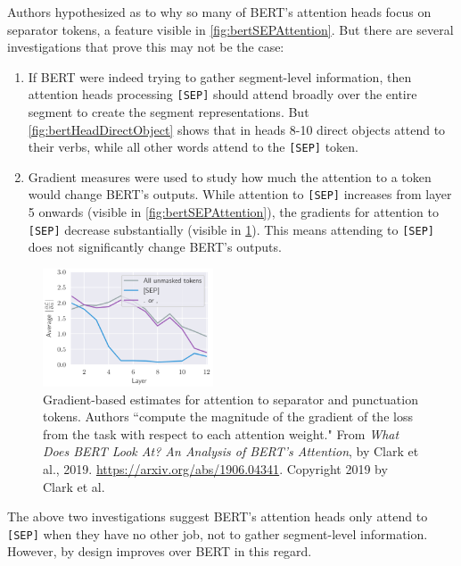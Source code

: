 Authors hypothesized as to why so many of BERT's attention heads focus on separator tokens, a feature visible in \cref{fig:bertSEPAttention}. But there are several investigations that prove this may not be the case: 
\begin{enumerate}
    \item If BERT were indeed trying to gather segment-level information, then attention heads processing \texttt{[SEP]} should attend broadly over the entire segment to create the segment representations. But \cref{fig:bertHeadDirectObject} shows that in heads 8-10 direct objects attend to their verbs, while all other words attend to the \texttt{[SEP]} token. 
    
    \item Gradient measures were used to study how much the attention to a token would change BERT's outputs. While attention to \texttt{[SEP]} increases from layer 5 onwards (visible in \cref{fig:bertSEPAttention}), the gradients for attention to \texttt{[SEP]} decrease substantially (visible in \cref{fig:bertGradient}). This means attending to \texttt{[SEP]} does not significantly change BERT's outputs. 
\end{enumerate}


\begin{figure}[h]
\vspace{-5pt}
\centering
\includegraphics[width=0.45\textwidth]{imgs/bert_attentionheads_gradient.png}
\vspace{-5pt}
\caption{\footnotesize Gradient-based estimates for attention to separator and punctuation tokens. Authors ``compute the magnitude of the gradient of the loss from the  task with respect to each attention weight." From \emph{What Does BERT Look At? An Analysis of BERT's Attention}, by Clark et al., 2019. \url{https://arxiv.org/abs/1906.04341}. Copyright 2019 by Clark et al.}
\vspace{-5pt}
\label{fig:bertGradient}
\end{figure}



The above two investigations suggest BERT's attention heads only attend to \texttt{[SEP]} when they have no other job, not to gather segment-level information. However,  by design improves over BERT in this regard. 









